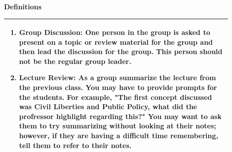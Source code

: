 \documentclass{article}
\begin{document}
\vspace{0.5cm}
{\large\textbf{Definitions}}
\\
\begin{tabular}{|p{0.9\linewidth}|}
\hline
\begin{minipage}[t]{0.9\linewidth}
\begin{enumerate}[label=\alph*.]
    \item\textbf{Group Discussion:} One person in the group is asked to present on a topic or review material for the group and then lead the discussion for the group. This person should not be the regular group leader.
   \item\textbf{Lecture Review:} As a group summarize the lecture from the previous class. You may have to provide prompts for the students. For example, "The first concept discussed was Civil Liberties and Public Policy, what did the profressor highlight regarding this?" You may want to ask them to try summarizing without looking at their notes; however, if they are having a difficult time remembering, tell them to refer to their notes.
\end{enumerate}
\end{minipage} \\
\hline
\end{tabular}
\newpage
\noindent
\end{document}
